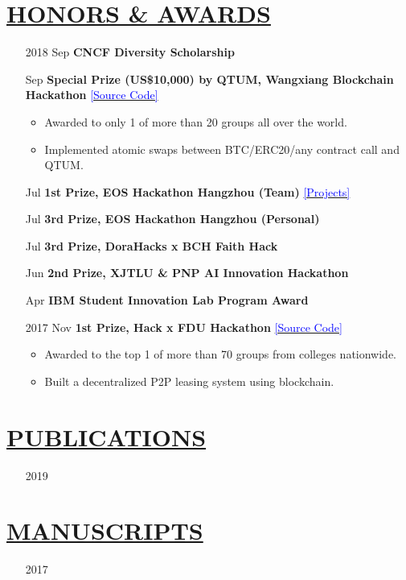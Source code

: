 \documentclass[11pt]{article}
\begin{document}
\section*{\centering\underline{HONORS \& AWARDS}}
\begin{itemize}[noitemsep, nolistsep]
    \item[2018] Sep \textbf{CNCF Diversity Scholarship}
    \item[\phantom{2018}] Sep \textbf{Special Prize (US\$10,000) by QTUM, Wangxiang Blockchain Hackathon} \href{https://github.com/PRIEWIENV/QtumSwap}{\textcolor{blue}{[Source Code]}}
        \begin{itemize}[noitemsep, nolistsep]
            \item Awarded to only 1 of more than 20 groups all over the world. 
            \item Implemented atomic swaps between BTC/ERC20/any contract call and QTUM.
        \end{itemize} 
    \item[\phantom{2018}] Jul \textbf{1st Prize, EOS Hackathon Hangzhou (Team)} \href{https://github.com/Acappella-dream}{\textcolor{blue}{[Projects]}}
    \item[\phantom{2018}] Jul \textbf{3rd Prize, EOS Hackathon Hangzhou (Personal)}
    \item[\phantom{2018}] Jul \textbf{3rd Prize, DoraHacks x BCH Faith Hack}
    \item[\phantom{2018}] Jun \textbf{2nd Prize, XJTLU \& PNP AI Innovation Hackathon}
    \item[\phantom{2018}] Apr \textbf{IBM Student Innovation Lab Program Award}
    \item[2017] Nov \textbf{1st Prize, Hack x FDU Hackathon} \href{https://github.com/dexhunter/hackxfdu-DSharing}{\textcolor{blue}{[Source Code]}}
        \begin{itemize}[noitemsep, nolistsep]
            \item Awarded to the top 1 of more than 70 groups from colleges nationwide.
            \item Built a decentralized P2P leasing system using blockchain. 
        \end{itemize} 
\end{itemize}




\section*{\centering\underline{PUBLICATIONS}}
\begin{itemize}
    \item[2019] 
\end{itemize}
\section*{\centering\underline{MANUSCRIPTS}}
\begin{itemize}
    \item[2017] 
\end{itemize}
\end{document}
